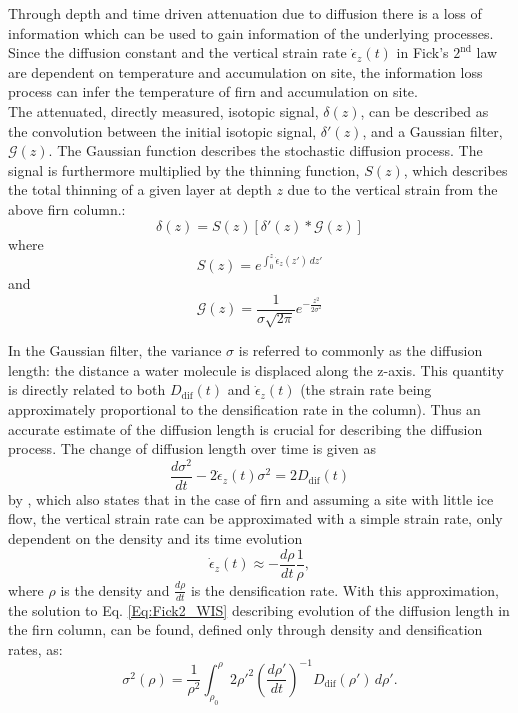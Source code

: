 \documentclass[../../CompleteThesis2/Complete_2ndDraft]{subfiles}
\begin{document}
Through depth and time driven attenuation due to diffusion there is a loss of information which can be used to gain information of the underlying processes. Since the diffusion constant and the vertical strain rate $\dot{\epsilon}_z(t)$ in Fick's $2^{\text{nd}}$ law are dependent on temperature and accumulation on site, the information loss process can infer the temperature of firn and accumulation on site.\\
The attenuated, directly measured, isotopic signal, $\delta(z)$, can be described as the convolution between the initial isotopic signal, $\delta '(z)$, and a Gaussian filter, $\mathcal{G}(z)$. The Gaussian function describes the stochastic diffusion process. The signal is furthermore multiplied by the thinning function, $S(z)$, which describes the total thinning of a given layer at depth $z$ due to the vertical strain from the above firn column.:
\begin{equation}
	\delta(z) = S(z)[\delta'(z)*\mathcal{G}(z)]
	\label{Eq:diff_solution_conv}
\end{equation}
where
\begin{equation}
	S(z) = e^{\int_{0}^{z}\dot{\epsilon}_z(z')\, dz'}
	\label{Eq:Thinning_fct}
\end{equation}
and
\begin{equation}
	\mathcal{G}(z) = \frac{1}{\sigma\sqrt{2\pi}}e^{-\frac{z^2}{2\sigma^2}}
	\label{Eq:Gauss_filter}
\end{equation}

In the Gaussian filter, the variance $\sigma$ is referred to commonly as the diffusion length: the distance a water molecule is displaced along the z-axis. This quantity is directly related to both $D_{\text{dif}}(t)$ and $\dot{\epsilon}_z(t)$ (the strain rate being approximately proportional to the densification rate in the column). Thus an accurate estimate of the diffusion length is crucial for describing the diffusion process.
The change of diffusion length over time is given as 
\begin{equation}
	\frac{d\sigma^2}{dt} - 2\dot{\epsilon}_z (t)\sigma^2 = 2 D_{\text{dif}}(t)
	\label{Eq:Evolution_DiffLen}
\end{equation}
by \cite[Johnsen, 1977]{Johnsen1977}, which also states that in the case of firn and assuming a site with little ice flow, the vertical strain rate can be approximated with a simple strain rate, only dependent on the density and its time evolution
\begin{equation}
	\dot{\epsilon}_z(t) \approx - \frac{d\rho}{dt}\frac{1}{\rho}
	\label{Eq:strain_rate_approx},
\end{equation}
where $\rho$ is the density and $\frac{d\rho}{dt}$ is the densification rate. With this approximation, the solution to Eq. \ref{Eq:Fick2_WIS} describing evolution of the diffusion length in the firn column, can be found, defined only through density and densification rates, as:
\begin{equation}
	\sigma^2(\rho) =\frac{1}{\rho^2} \int_{\rho_0}^{\rho}2\rho'^2\left(\frac{d\rho'}{dt}\right)^{-1} D_{\text{dif}}(\rho') \, d\rho'.
	\label{Eq:Diff_Len_Firn}
\end{equation}
\end{document}
